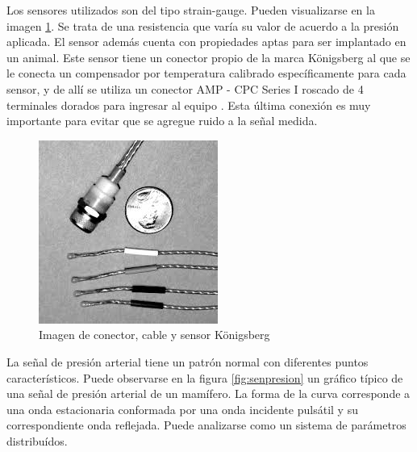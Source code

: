 Los sensores utilizados son del tipo strain-gauge. Pueden visualizarse en la imagen \ref{fig:konigsberg}. Se trata de una resistencia que varía su valor de acuerdo a la presión aplicada. El sensor además cuenta con propiedades aptas para ser implantado en un animal. Este sensor tiene un conector propio de la marca Königsberg al que se le conecta un compensador por temperatura calibrado específicamente para cada sensor, y de allí se utiliza un conector AMP - CPC Series I roscado de 4 terminales dorados para ingresar al equipo \citep{conectores}. Esta última conexión es muy importante para evitar que se agregue ruido a la señal medida.

\begin{figure}[!htbp]
	\centering
	\includegraphics[width=\textwidth]{./Figures/konigsberg.jpeg}
	\caption{Imagen de conector, cable y sensor Königsberg}
	\label{fig:konigsberg}
\end{figure}

La señal de presión arterial tiene un patrón normal con diferentes puntos característicos. Puede observarse en la figura \ref{fig:senpresion} un gráfico típico de una señal de presión arterial de un mamífero. La forma de la curva corresponde a una onda estacionaria conformada por una onda incidente pulsátil y su correspondiente onda reflejada. Puede analizarse como un sistema de parámetros distribuídos. 


